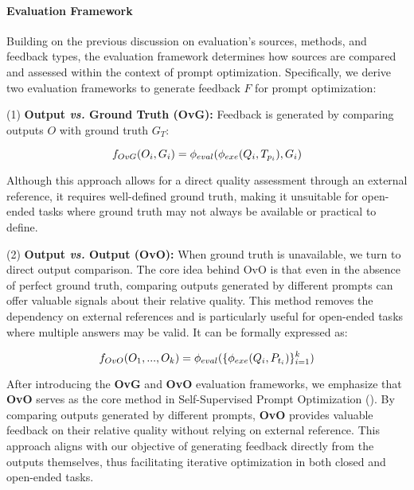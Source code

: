 \paragraph{Evaluation Framework}
Building on the previous discussion on evaluation's sources, methods, and feedback types, the evaluation framework determines how sources are compared and assessed within the context of prompt optimization. Specifically, we derive two evaluation frameworks to generate feedback $F$ for prompt optimization:


(1) \textbf{Output \textit{vs.} Ground Truth (OvG):} 
    Feedback is generated by comparing outputs $O$ with ground truth $G_T$:
    
    \begin{equation}
    \small
        f_{OvG}(O_i, G_i) = \phi_{eval}(\phi_{exe}(Q_i, T_{p_i}), G_i)
    \end{equation}
    
    Although this approach allows for a direct quality assessment through an external reference, it requires well-defined ground truth, making it unsuitable for open-ended tasks where ground truth may not always be available or practical to define.
    
(2) \textbf{Output \textit{vs.} Output (OvO):}
    When ground truth is unavailable, we turn to direct output comparison. The core idea behind OvO is that even in the absence of perfect ground truth, comparing outputs generated by different prompts can offer valuable signals about their relative quality. This method removes the dependency on external references and is particularly useful for open-ended tasks where multiple answers may be valid. It can be formally expressed as:
    
    \begin{equation}\small
        f_{OvO}(O_1, ..., O_k) = \phi_{eval}(\{\phi_{exe}(Q_i, P_{t_i})\}_{i=1}^k)
    \end{equation}

After introducing the \textbf{OvG} and \textbf{OvO} evaluation frameworks, we emphasize that \textbf{OvO} serves as the core method in Self-Supervised Prompt Optimization (\ours). By comparing outputs generated by different prompts, \textbf{OvO} provides valuable feedback on their relative quality without relying on external reference. This approach aligns with our objective of generating feedback directly from the outputs themselves, thus facilitating iterative optimization in both closed and open-ended tasks.
